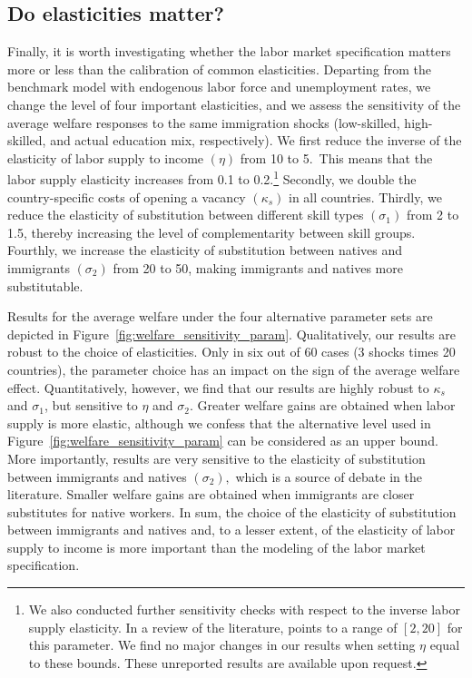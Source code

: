 \documentclass[a4paper,12pt]{article}
\begin{document}
\subsection{Do elasticities matter?} \label{sensitivity_to_parameters}

Finally, it is worth investigating whether the labor market specification matters more or less than the calibration of common elasticities. Departing from the benchmark model with endogenous labor force and unemployment rates, we change the level of four important elasticities, and we assess the sensitivity of the average welfare responses to the same immigration shocks (low-skilled, high-skilled, and actual education mix, respectively). We first reduce the inverse of the elasticity of labor supply to income $\left( \eta \right)$ from 10 to 5.\ This means that the labor supply elasticity increases from 0.1 to 0.2.\footnote{We also conducted further sensitivity checks with respect to the inverse labor supply elasticity. In a review of the literature, \citet{Card1991} points to a range of $[2,20]$ for this parameter. We find no major changes in our results when setting $\eta$ equal to these bounds. These unreported results are available upon request.} Secondly, we double the country-specific costs of opening a vacancy $\left( \kappa _{s}\right) $ in all countries. Thirdly, we reduce the elasticity of substitution between different skill types $\left( \sigma_{1}\right) $ from 2 to 1.5, thereby increasing the level of complementarity between skill groups. Fourthly, we increase the elasticity of substitution between natives and immigrants $\left( \sigma _{2}\right) $ from 20 to 50, making immigrants and natives more substitutable.

Results for the average welfare under the four alternative parameter sets are depicted in Figure~\ref{fig:welfare_sensitivity_param}. Qualitatively, our results are robust to the choice of elasticities. Only in six out of 60 cases (3 shocks times 20 countries), the parameter choice has an impact on the sign of the average welfare effect. Quantitatively, however, we find that our results are highly robust to $\kappa _{s}$ and $\sigma _{1}$, but sensitive to $\eta $ and $\sigma _{2}$. Greater welfare gains are obtained when labor supply is more elastic, although we confess that the alternative level used in Figure~\ref{fig:welfare_sensitivity_param} can be considered as an upper bound. More importantly, results are very sensitive to the elasticity of substitution between immigrants and natives $\left( \sigma _{2}\right),$ which is a source of debate in the literature. Smaller welfare gains are obtained when immigrants are closer substitutes for native workers. In sum, the choice of the elasticity of substitution between immigrants and natives and, to a lesser extent, of the elasticity of labor supply to income is more important than the modeling of the labor market specification.
 
\end{document}
